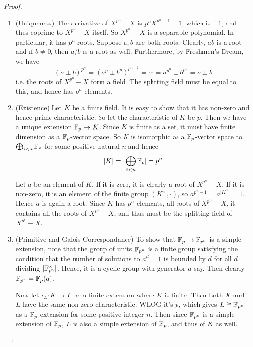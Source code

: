 \documentclass[../book.tex]{subfiles}
\begin{document}
\begin{proof}
    \begin{enumerate}
    
        \item (Uniqueness)
        The derivative of $X^{p^n} - X$ is $p^{n} X^{p^n - 1} -1$, 
        which is $-1$, and thus coprime to $X^{p^n} - X$ itself.
        So $X^{p^n} - X$ is a separable polynomial. 
        In particular, it has $p^n$ roots. 
        Suppose $a, b$ are both roots.
        Clearly, $ab$ is a root and if $b \neq 0$, then $a / b$ is a root as well.
        Furthermore, by Freshmen's Dream, we have \[
            (a \pm b)^{p^n} = (a^p \pm b^p)^{p^{n-1}} = \cdots
            = a^{p^n} \pm b^{p^n} = a \pm b
        \]
        i.e. the roots of $X^{p^n} - X$ form a field.
        The splitting field must be equal to this, and hence has $p^n$ elements.
        
        \item (Existence)
        Let $K$ be a finite field. 
        It is easy to show that it has non-zero and hence prime characteristic. 
        So let the characteristic of $K$ be $p$. 
        Then we have a unique extension $\mathbb{F}_p \to K$. 
        Since $K$ is finite as a set, 
        it must have finite dimension as a $\mathbb{F}_p$-vector space.
        So $K$ is isomorphic as a $\mathbb{F}_p$-vector space to $\bigoplus_{i < n} \mathbb{F}_p$ 
        for some positive natural $n$ and hence \[
            |K| = |\bigoplus_{i < n} \mathbb{F}_p| = p^n
        \]
        
        Let $a$ be an element of $K$.
        If it is zero, it is clearly a root of $X^{p^n} - X$.
        If it is non-zero, it is an element of the finite group $(K^\times,\cdot)$,
        so $a^{p^n - 1} = a^{|K^\times|} = 1$.
        Hence $a$ is again a root. 
        Since $K$ has $p^n$ elements, all roots of $X^{p^n} - X$, 
        it contains all the roots of $X^{p^n} - X$,
        and thus must be the splitting field of $X^{p^n} - X$.
        
        \item (Primitive and Galois Correspondance)
        To show that $\mathbb{F}_p \to \mathbb{F}_{p^n}$ is a simple extension,
        note that the group of units $\mathbb{F}_{p^n}$ is a finite group
        satisfying the condition that the number of solutions to $a^d = 1$ 
        is bounded by $d$ for all $d$ dividing $|\mathbb{F}_{p^n}^\times|$. 
        Hence, it is a cyclic group with generator $a$ say. 
        Then clearly $\mathbb{F}_{p^n} = \mathbb{F}_p(a)$. 
        
        Now let $\iota_L : K \to L$ be a finite extension where $K$ is finite.
        Then both $K$ and $L$ have the same non-zero characteristic.
        WLOG it's $p$, which gives $L \cong \mathbb{F}_{p^n}$ as a $\mathbb{F}_p$-extension
        for some positive integer $n$. 
        Then since $\mathbb{F}_{p^n}$ is a simple extension of $\mathbb{F}_p$,
        $L$ is also a simple extension of $\mathbb{F}_p$,
        and thus of $K$ as well. 
        

\end{enumerate}
\end{proof}
\end{document}
